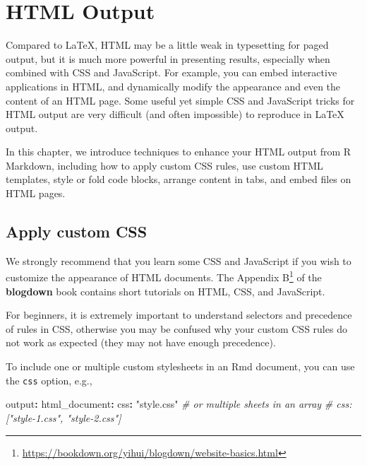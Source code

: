 \documentclass[
  11pt,
]{krantz}
\newenvironment{Shaded}{\begin{snugshade}}{\end{snugshade}}
\newcommand{\AttributeTok}[1]{\textcolor[rgb]{0.61,0.61,0.61}{#1}}
\newcommand{\CommentTok}[1]{\textcolor[rgb]{0.37,0.37,0.37}{\textit{#1}}}
\newcommand{\FunctionTok}[1]{\textcolor[rgb]{0,0,0}{#1}}
\newcommand{\KeywordTok}[1]{\textcolor[rgb]{0.27,0.27,0.27}{\textbf{#1}}}
\newcommand{\StringTok}[1]{\textcolor[rgb]{0.5,0.5,0.5}{#1}}
\renewcommand{\href}[2]{#2\footnote{\url{#1}}}
\begin{document}
\hypertarget{html-output}{%
\chapter{HTML Output}\label{html-output}}

Compared to LaTeX, HTML may be a little weak in typesetting for paged output, but it is much more powerful in presenting results, especially when combined with CSS and JavaScript. For example, you can embed interactive applications in HTML, and dynamically modify the appearance and even the content of an HTML page. Some useful yet simple CSS and JavaScript tricks for HTML output are very difficult (and often impossible) to reproduce in LaTeX output.

In this chapter, we introduce techniques to enhance your HTML output from R Markdown, including how to apply custom CSS rules, use custom HTML templates, style or fold code blocks, arrange content in tabs, and embed files on HTML pages.

\hypertarget{html-css}{%
\section{Apply custom CSS}\label{html-css}}

We strongly recommend that you learn some CSS and JavaScript if you wish to customize the appearance of HTML documents. The \href{https://bookdown.org/yihui/blogdown/website-basics.html}{Appendix B} of the \textbf{blogdown} book \citep{blogdown2017} contains short tutorials on HTML, CSS, and JavaScript.

For beginners, it is extremely important to understand selectors and precedence of rules in CSS, otherwise you may be confused why your custom CSS rules do not work as expected (they may not have enough precedence).

To include one or multiple custom stylesheets in an Rmd document, you can use the \texttt{css} option, e.g.,

\begin{Shaded}
\begin{Highlighting}[]
\FunctionTok{output}\KeywordTok{:}
\AttributeTok{  }\FunctionTok{html_document}\KeywordTok{:}
\AttributeTok{    }\FunctionTok{css}\KeywordTok{:}\AttributeTok{ }\StringTok{"style.css"}
\CommentTok{    # or multiple sheets in an array}
\CommentTok{    # css: ["style-1.css", "style-2.css"]}
\end{Highlighting}
\end{Shaded}
\end{document}
